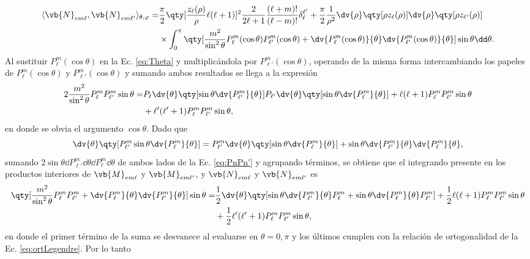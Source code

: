 %
\begin{align*}
\langle\vb{N}_{em\ell},  \vb{N}_{em\ell'} \rangle_{\theta,\varphi} =&
				\frac{\pi}{2} \qty[\frac{z_\ell(\rho)}{\rho}\ell(\ell+1)]^2\frac{2}{2\ell+1}\frac{(\ell+m)!}{(\ell-m)!}\delta_\ell^{\ell'}+
				\frac{\pi}{2} \frac{1}{\rho^2}\dv{\rho}\qty[\rho z_\ell (\rho)]\dv{\rho}\qty[\rho z_{\ell'}(\rho)]\\
				&\times \int_0^\pi\qty[\frac{m^2}{\sin^2\theta}P_\ell^m(\cos\theta)P_{\ell'}^m(\cos\theta)
					+\dv{P_\ell^m(\cos\theta)}{\theta}\dv{P_{\ell'}^m(\cos\theta)}{\theta}]\sin\theta\dd\theta.	
\end{align*}
%
Al sustituir $P_\ell^m(\cos\theta)$ en la Ec. \eqref{eq:Theta} y multiplicándola por $P_{\ell'}^m(\cos\theta)$, operando de la misma forma intercambiando los papeles de $P_\ell^m(\cos\theta)$  y $P_{\ell'}^m(\cos\theta)$ y sumando ambos resultados se llega a la expresión 
	\begin{align}
	2\frac{m^2}{\sin^2\theta}P_\ell^m P_{\ell'}^m \sin\theta =&
					 P_\ell\dv{\theta}\qty[\sin\theta \dv{P_{\ell'}^m}{\theta}] P_{\ell'}\dv{\theta}\qty[\sin\theta \dv{P_\ell^m}{\theta}]
					 +	\ell(\ell+1)P_\ell^m P_{\ell'}^m	 \sin\theta  \notag\\
					 &+ \ell'(\ell'+1)P_\ell^m P_{\ell'}^m\sin\theta, \label{eq:PnPn'}
	\end{align}
en donde se obvia el argumento $\cos\theta$. Dado que 
	\begin{equation*}
	\dv{\theta}\qty[P_{\ell'}^m\sin\theta  \dv{P_\ell^m}{\theta}] 
	= P_{\ell'}^m\dv{\theta}\qty[\sin\theta \dv{P_\ell^m}{\theta}] + \sin\theta\dv{P_{\ell'}^m}{\theta}\dv{P_\ell^m}{\theta},
	\end{equation*}
sumando $2\sin\theta\dd P_{\ell'}^m\dd\theta \dd P_\ell^m \dd\theta$ de ambos lados de la Ec. \eqref{eq:PnPn'} y agrupando términos, se obtiene que el integrando presente en los productos interiores de  $\vb{M}_{em\ell}$ y $\vb{M}_{em\ell'}$, y $\vb{N}_{em\ell}$ y $\vb{N}_{em\ell'}$ es
	\begin{align*}
	\qty[\frac{m^2}{\sin^2\theta}P_\ell^mP_{\ell'}^m	+\dv{P_\ell^m}{\theta}\dv{P_{\ell'}^m}{\theta}]\sin\theta = &
					 \frac12 \dv{\theta}\qty[\sin\theta \dv{P_{\ell'}^m}{\theta}P_\ell^m + \sin\theta\dv{P_{\ell}^m}{\theta}P_{\ell'}^m ]
					 +	\frac12 \ell(\ell+1)P_\ell^m P_{\ell'}^m	 \sin\theta  \\
					 &+ \frac12 \ell'(\ell'+1)P_\ell^m P_{\ell'}^m\sin\theta,
	\end{align*}
en donde el primer término de la suma se desvanece al evaluarse en $\theta=0,\pi$ y los últimos cumplen con la relación de ortogonalidad de la Ec. \eqref{eq:ortLegendre}. Por lo tanto

